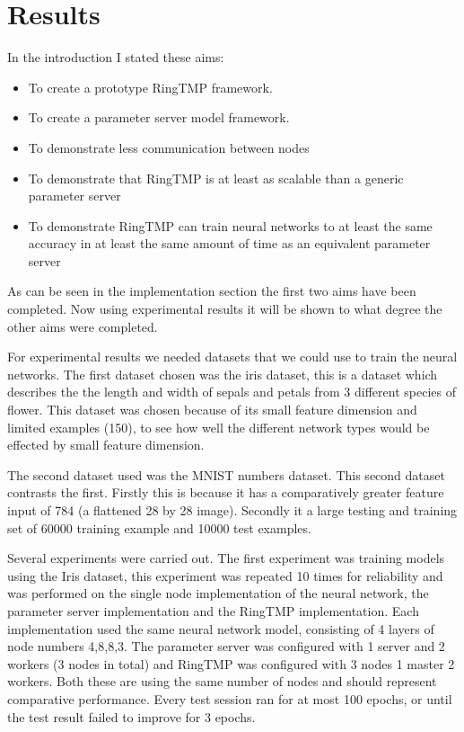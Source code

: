 \clearpage
\section{Results}
In the introduction I stated these aims:
\begin{itemize}
    \item To create a prototype RingTMP framework.
    \item To create a parameter server model framework.
    \item To demonstrate less communication between nodes
    \item To demonstrate that RingTMP is at least as scalable than a generic parameter
    server
    \item To demonstrate RingTMP can train neural networks to at least the same
    accuracy in at least the same amount of time as an equivalent parameter server
\end{itemize}

As can be seen in the implementation section the first two aims have been
completed. Now using experimental results it will be shown to what degree the
other aims were completed.

For experimental results we needed datasets that we could use to train the
neural networks. The first dataset chosen was the iris dataset, this is a
dataset which describes the the length and width of sepals and petals from 3
different species of flower. This dataset was chosen because of its small
feature dimension and limited examples (150), to see how well the different
network types would be effected by small feature dimension.

The second dataset used was the MNIST numbers dataset. \cite{lecun2010mnist}
This second dataset contrasts the first. Firstly this is because it has a
comparatively greater feature input of 784 (a flattened 28 by 28 image).
Secondly it a large testing and training set of 60000 training example and 10000
test examples.

Several experiments were carried out. The first experiment was training models
using the Iris dataset, this experiment was repeated 10 times for reliability
and was performed on the single node implementation of the neural network, the
parameter server implementation and the RingTMP implementation. Each
implementation used the same neural network model, consisting of 4 layers of
node numbers 4,8,8,3. The parameter server was configured with 1 server and 2
workers (3 nodes in total) and RingTMP was configured with 3 nodes 1 master 2
workers. Both these are using the same number of nodes and should represent
comparative performance. Every test session ran for at most 100 epochs, or until the
test result failed to improve for 3 epochs.

